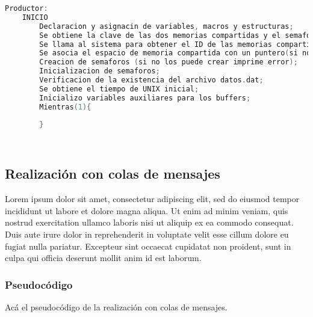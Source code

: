 \begin{lstlisting}[language=C]          % No usar tildes en el pseudocódigo
    Productor:
    INICIO
        Declaracion y asignacin de variables, macros y estructuras;
        Se obtiene la clave de las dos memorias compartidas y el semaforo (en el caso de que no las obtenga imprime error);
        Se llama al sistema para obtener el ID de las memorias compartidas (en el caso de que no las obtenga imprime error);
        Se asocia el espacio de memoria compartida con un puntero(si no puede asociar imprime error);
        Creacion de semaforos (si no los puede crear imprime error);
        Inicializacion de semaforos;
        Verificacion de la existencia del archivo datos.dat;
        Se obtiene el tiempo de UNIX inicial;
        Inicializo variables auxiliares para los buffers;
        Mientras(1){
        
        }
    
    
\end{lstlisting}

\subsection{Realización con colas de mensajes}

Lorem ipsum dolor sit amet, consectetur adipiscing elit, sed do eiusmod tempor incididunt ut labore et dolore magna aliqua. Ut enim ad minim veniam, quis nostrud exercitation ullamco laboris nisi ut aliquip ex ea commodo consequat. Duis aute irure dolor in reprehenderit in voluptate velit esse cillum dolore eu fugiat nulla pariatur. Excepteur sint occaecat cupidatat non proident, sunt in culpa qui officia deserunt mollit anim id est laborum.

\subsubsection{Pseudocódigo}

Acá el pseudocódigo de la realización con colas de mensajes.




